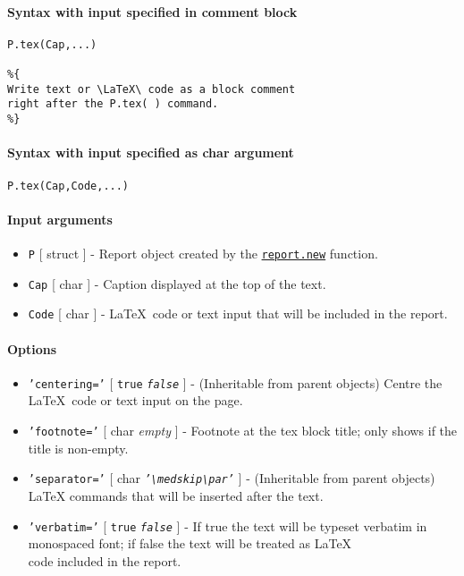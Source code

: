 


	\paragraph{Syntax with input specified in comment
block}

\begin{verbatim}
P.tex(Cap,...)

%{
Write text or \LaTeX\ code as a block comment
right after the P.tex( ) command.
%}
\end{verbatim}

\paragraph{Syntax with input specified as char
argument}

\begin{verbatim}
P.tex(Cap,Code,...)
\end{verbatim}

\paragraph{Input arguments}

\begin{itemize}
\item
  \texttt{P} {[} struct {]} - Report object created by the
  \href{report/new}{\texttt{report.new}} function.
\item
  \texttt{Cap} {[} char {]} - Caption displayed at the top of the text.
\item
  \texttt{Code} {[} char {]} - \LaTeX~code or text input that will be
  included in the report.
\end{itemize}

\paragraph{Options}

\begin{itemize}
\item
  \texttt{'centering='} {[} \texttt{true} \textbar{}
  \emph{\texttt{false}} {]} - (Inheritable from parent objects) Centre
  the \LaTeX~code or text input on the page.
\item
  \texttt{'footnote='} {[} char \textbar{} \emph{empty} {]} - Footnote
  at the tex block title; only shows if the title is non-empty.
\item
  \texttt{'separator='} {[} char \textbar{}
  \emph{\texttt{'\textbackslash{}medskip\textbackslash{}par'}} {]} -
  (Inheritable from parent objects) LaTeX commands that will be inserted
  after the text.
\item
  \texttt{'verbatim='} {[} \texttt{true} \textbar{}
  \emph{\texttt{false}} {]} - If true the text will be typeset verbatim
  in monospaced font; if false the text will be treated as \LaTeX\\code
  included in the report.
\end{itemize}

